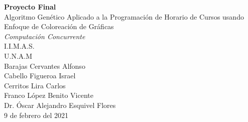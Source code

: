 \documentclass{article}
\begin{document}
\vspace{1cm}
\begin{center}
    \textbf{{\Huge Proyecto Final}} 
    \\ \vspace{0.5cm}
    \huge Algoritmo Gen\'etico Aplicado a la Programaci\'on de Horario de Cursos usando Enfoque de Coloreaci\'on de Gr\'aficas  
    \\ \vspace{0.5cm}
    \textit{\Large Computaci\'on Concurrente }
    \\ \vspace{0.5cm}
    \Large I.I.M.A.S.
    \\ \vspace{0.2cm}
    \Large U.N.A.M
    \\ \vspace{1cm}
    \huge Barajas Cervantes Alfonso\\
    \huge Cabello Figueroa Israel\\
    \huge Cerritos Lira Carlos  \\
    \huge Franco López Benito Vicente
    \\ \vspace{1.2cm}
    \Large Dr. \'Oscar Alejandro Esquivel  Flores
    \\ \vspace{1cm}
    \Large 9 de febrero del 2021
\end{center}
\newpage
{}
\begin{abstract}
    En este  documento presentamos un  diseño, análisis e implementación de un algoritmo gen\'etico para el problema de  coloreo de gr\'aficas. El algoritmo gen\'etico desarrolado aqu\'i utiliza m\'as de una selecci\'on de padre y m\'etodos de mutaci\'on dependiendo en el estado de fitness de la mejor soluci\'on. Esto resulta en un cambio de la soluci\'on al \'optimo global m\'as r\'apidamente que usando una selecci\'on de un padre o el m\'etodo de mutaci\'on. Conseguimos colorear de un noventa a un cien por ciento nuestras gráficas de muestra con el algoritmo con la cantidad de colores requerida para cada problema.
    Así mismo se mejora este programa usando una implementación concurrente de este algoritmo. Presentamos la implementación y comparación del algoritmo paralelo con una versión secuencial. Obtuvimos un rendimiento de tres a seis veces superior para nuestros casos de aplicación con la versión paralela.  

\end{abstract}
\end{document}
